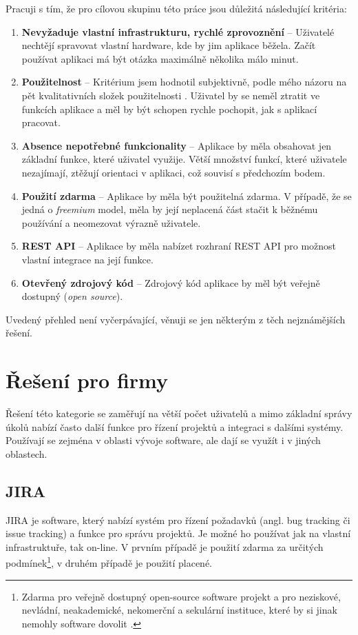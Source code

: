 \documentclass[thesis=B,czech]{FITthesis}[2012/06/26]
\newcommand{\crita}{Nevyžaduje vlastní infrastrukturu, rychlé zprovoznění}
\newcommand{\critb}{Použitelnost}
\newcommand{\critc}{Absence nepotřebné funkcionality}
\newcommand{\critd}{Použití zdarma}
\newcommand{\critf}{REST API}
\newcommand{\critg}{Otevřený zdrojový kód}
\begin{document}
	Pracuji s tím, že pro cílovou skupinu této práce jsou důležitá následující kritéria:
	\begin{enumerate}
		\item \textbf{\crita} -- Uživatelé nechtějí spravovat vlastní hardware, kde by jim aplikace běžela. Začít používat aplikaci má být otázka maximálně několika málo minut.
		\item \textbf{\critb} -- Kritérium jsem hodnotil subjektivně, podle mého názoru na pět kvalitativních složek použitelnosti \cite{usability}. Uživatel by se neměl ztratit ve funkcích aplikace a měl by být schopen rychle pochopit, jak s aplikací pracovat. 
		\item \textbf{\critc} -- 	Aplikace by měla obsahovat jen základní funkce, které uživatel využije. Větší množství funkcí, které uživatele nezajímají, ztěžují orientaci v aplikaci, což souvisí s předchozím bodem.
		\item \textbf{\critd} -- Aplikace by měla být použitelná zdarma. V případě, že se jedná o \textit{freemium} model, měla by její neplacená část stačit k běžnému používání a neomezovat výrazně uživatele.
		\item \textbf{\critf} -- Aplikace by měla nabízet rozhraní REST API pro možnost vlastní integrace na její funkce.
		\item \textbf{\critg} -- Zdrojový kód aplikace by měl být veřejně dostupný (\textit{open source}).
	\end{enumerate}
	Uvedený přehled není vyčerpávající, věnuji se jen některým z těch nejznámějších řešení. 

	\section{Řešení pro firmy}
		\label{sec:solutions-companies}
		Řešení této kategorie se zaměřují na větší počet uživatelů a mimo základní správy úkolů nabízí často další funkce pro řízení projektů a integraci s dalšími systémy. Používají se zejména v oblasti vývoje software, ale dají se využít i v jiných oblastech.
		
		\subsection{JIRA}
			JIRA \cite{jira} je software, který nabízí systém pro řízení požadavků (angl. bug tracking či issue tracking) a funkce pro správu projektů. Je možné ho používat jak na vlastní infrastruktuře, tak on-line. V prvním případě je použití zdarma za určitých podmínek\footnote{Zdarma pro veřejně dostupný open-source software projekt\cite{jira-lic-opensource} a pro neziskové, nevládní, neakademické, nekomerční a sekulární instituce, které by si jinak nemohly software dovolit \cite{jira-lic-nonprofit}.}, v druhém případě je použití placené. 
			
\end{document}
